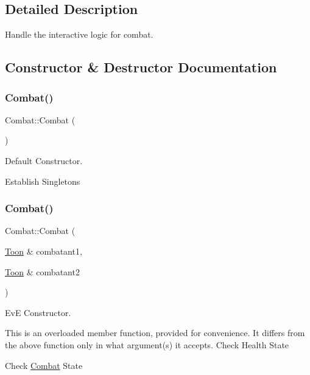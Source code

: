 \subsection{Detailed Description}
Handle the interactive logic for combat. 

\subsection{Constructor \& Destructor Documentation}
\mbox{\label{classCombat_a4c2dfed2f9da749ae341de25c7427f73}} 
\subsubsection{\texorpdfstring{Combat()}{Combat()}\hspace{0.1cm}{\footnotesize\ttfamily [1/4]}}
{\footnotesize\ttfamily Combat\+::\+Combat (\begin{DoxyParamCaption}{ }\end{DoxyParamCaption})}



Default Constructor. 

Establish Singletons \mbox{\label{classCombat_a795ca85f83c3692b12ed7e461011e759}} 
\subsubsection{\texorpdfstring{Combat()}{Combat()}\hspace{0.1cm}{\footnotesize\ttfamily [2/4]}}
{\footnotesize\ttfamily Combat\+::\+Combat (\begin{DoxyParamCaption}\item[{\mbox{\hyperlink{classToon}{Toon}} \&}]{combatant1,  }\item[{\mbox{\hyperlink{classToon}{Toon}} \&}]{combatant2 }\end{DoxyParamCaption})}



EvE Constructor. 

This is an overloaded member function, provided for convenience. It differs from the above function only in what argument(s) it accepts. Check Health State

Check \mbox{\hyperlink{classCombat}{Combat}} State

